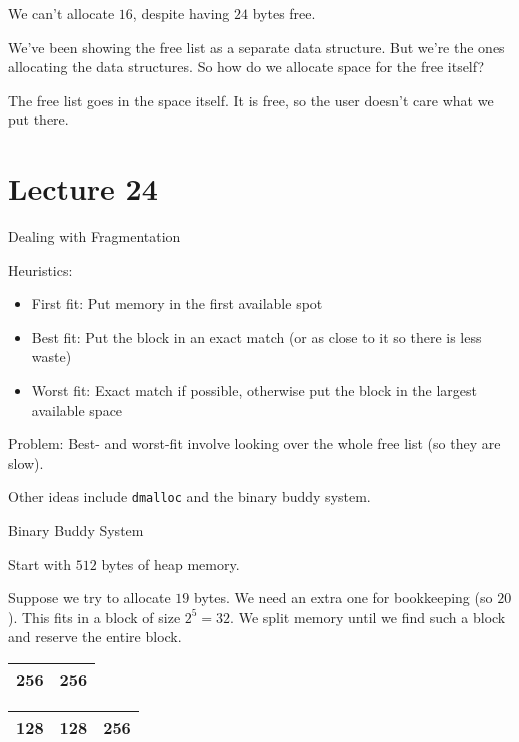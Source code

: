 \documentclass{article}
\begin{document}
We can't allocate \(16\), despite having \(24\) bytes free.

We've been showing the free list as a separate data structure. But we're
the ones allocating the data structures. So how do we allocate space for
the free itself?

The free list goes in the space itself. It is free, so the user doesn't
care what we put there.

\section{Lecture 24}\label{lecture-24}

Dealing with Fragmentation

Heuristics:

\begin{itemize}
    \item First fit: Put memory in the first available spot
    \item Best
fit: Put the block in an exact match (or as close to it so there is less
waste)
    \item Worst fit: Exact match if possible, otherwise put the block in
the largest available space
\end{itemize}


Problem: Best- and worst-fit involve looking over the whole free list
(so they are slow).

Other ideas include \texttt{dmalloc} and the binary buddy system.

Binary Buddy System

Start with \(512\) bytes of heap memory.

Suppose we try to allocate \(19\) bytes. We need an extra one for
bookkeeping (so \(20\)). This fits in a block of size \(2^5 = 32\). We
split memory until we find such a block and reserve the entire block.


\begin{table}[h]
    \centering
    \begin{tabular}{|c|c|}\hline
         256& 256\\\hline
    \end{tabular}
    
\end{table}

\begin{table}[h]
    \centering
    \begin{tabular}{|c|c|c|}\hline
         128& 128 & 256\\\hline
    \end{tabular}
    
\end{table}
\end{document}
